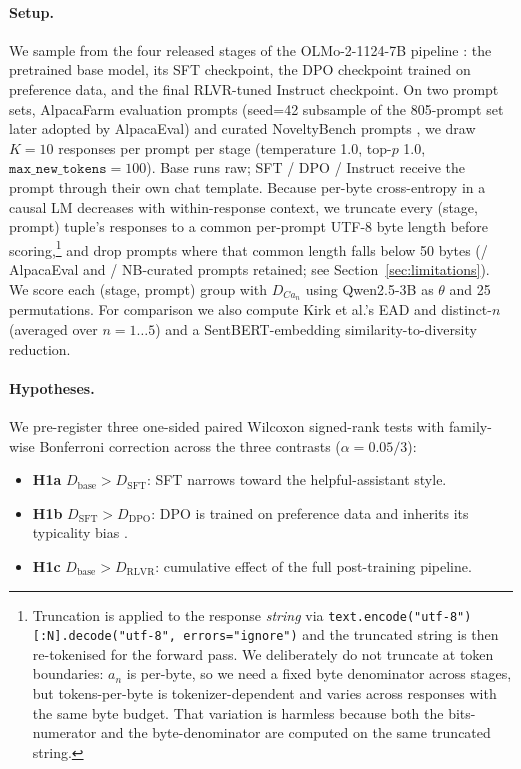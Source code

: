 \paragraph{Setup.} We sample from the four released stages of the OLMo-2-1124-7B pipeline \citep{olmo2024olmo2}: the pretrained base model, its SFT checkpoint, the DPO checkpoint trained on preference data, and the final RLVR-tuned Instruct checkpoint.
On two prompt sets, \olmoAlpacaN{} AlpacaFarm evaluation prompts \citep{dubois2024alpacafarm} (seed=42 subsample of the 805-prompt set later adopted by AlpacaEval) and \olmoNbCuratedN{} curated NoveltyBench prompts \citep{zhang2025noveltybench}, we draw $K{=}10$ responses per prompt per stage (temperature 1.0, top-$p$ 1.0, $\texttt{max\_new\_tokens}{=}100$).
Base runs raw; SFT / DPO / Instruct receive the prompt through their own chat template.
Because per-byte cross-entropy in a causal LM decreases with within-response context, we truncate every (stage, prompt) tuple's responses to a common per-prompt UTF-8 byte length before scoring,\footnote{Truncation is applied to the response \emph{string} via \texttt{text.encode("utf-8")[:N].decode("utf-8", errors="ignore")} and the truncated string is then re-tokenised for the forward pass. We deliberately do not truncate at token boundaries: $a_n$ is per-byte, so we need a fixed byte denominator across stages, but tokens-per-byte is tokenizer-dependent and varies across responses with the same byte budget. That variation is harmless because both the bits-numerator and the byte-denominator are computed on the same truncated string.} and drop prompts where that common length falls below 50 bytes (\olmoLmAlpacaN{}/\olmoAlpacaN{} AlpacaEval and \olmoLmNbCuratedN{}/\olmoNbCuratedN{} NB-curated prompts retained; see Section~\ref{sec:limitations}).
We score each (stage, prompt) group with $D_{Ca_n}$ using Qwen2.5-3B as $\theta$ and 25 permutations.
For comparison we also compute Kirk et al.'s EAD and distinct-$n$ (averaged over $n{=}1\ldots5$) and a SentBERT-embedding \citep{reimers2019sbert} similarity-to-diversity reduction.

\paragraph{Hypotheses.} We pre-register three one-sided paired Wilcoxon signed-rank tests \citep{dror2018hitchhiker} with family-wise Bonferroni correction across the three contrasts \citep{dror2017replicability} ($\alpha = 0.05/3$):

\begin{itemize}[nosep]
    \item \textbf{H1a} $D_{\mathrm{base}} > D_{\mathrm{SFT}}$: SFT narrows toward the helpful-assistant style.
    \item \textbf{H1b} $D_{\mathrm{SFT}} > D_{\mathrm{DPO}}$: DPO is trained on preference data and inherits its typicality bias \citep{zhang2025verbalizedsampling}.
    \item \textbf{H1c} $D_{\mathrm{base}} > D_{\mathrm{RLVR}}$: cumulative effect of the full post-training pipeline.
\end{itemize}

